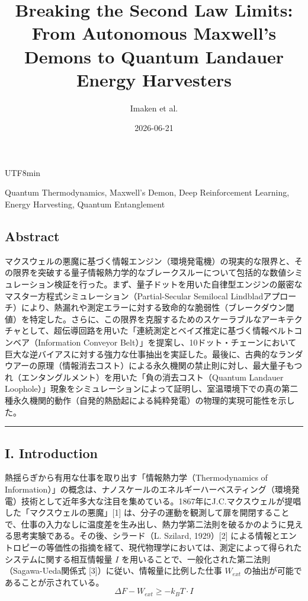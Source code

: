 \documentclass[a4paper,11pt,twocolumn]{article}
\title{Breaking the Second Law Limits: From Autonomous Maxwell's Demons to Quantum Landauer Energy Harvesters}
\author{Imaken et al.}
\date{2026-06-21}
\begin{document}
\begin{CJK*}{UTF8}{min}
\maketitle



 Quantum Thermodynamics, Maxwell's Demon, Deep Reinforcement Learning, Energy Harvesting, Quantum Entanglement


\subsection{Abstract}
マクスウェルの悪魔に基づく情報エンジン（環境発電機）の現実的な限界と、その限界を突破する量子情報熱力学的なブレークスルーについて包括的な数値シミュレーション検証を行った。まず、量子ドットを用いた自律型エンジンの厳密なマスター方程式シミュレーション（Partial-Secular Semilocal Lindbladアプローチ）により、熱漏れや測定エラーに対する致命的な脆弱性（ブレークダウン閾値）を特定した。さらに、この限界を克服するためのスケーラブルなアーキテクチャとして、超伝導回路を用いた「連続測定とベイズ推定に基づく情報ベルトコンベア（Information Conveyor Belt）」を提案し、10ドット・チェーンにおいて巨大な逆バイアスに対する強力な仕事抽出を実証した。最後に、古典的なランダウアーの原理（情報消去コスト）による永久機関の禁止則に対し、最大量子もつれ（エンタングルメント）を用いた「負の消去コスト（Quantum Landauer Loophole）」現象をシミュレーションによって証明し、室温環境下での真の第二種永久機関的動作（自発的熱励起による純粋発電）の物理的実現可能性を示した。

\vspace{1em}\hrule\vspace{1em}

\subsection{I. Introduction}
熱揺らぎから有用な仕事を取り出す「情報熱力学（Thermodynamics of Information）」の概念は、ナノスケールのエネルギーハーベスティング（環境発電）技術として近年多大な注目を集めている。1867年にJ.C.マクスウェルが提唱した「マクスウェルの悪魔」[1] は、分子の運動を観測して扉を開閉することで、仕事の入力なしに温度差を生み出し、熱力学第二法則を破るかのように見える思考実験である。その後、シラード（L. Szilard, 1929）[2] による情報とエントロピーの等価性の指摘を経て、現代物理学においては、測定によって得られたシステムに関する相互情報量 $I$ を用いることで、一般化された第二法則（Sagawa-Ueda関係式 [3]）に従い、情報量に比例した仕事 $W_{ext}$ の抽出が可能であることが示されている。
\begin{equation} \Delta F - W_{ext} \geq -k_B T \cdot I \end{equation}


\end{CJK*}
\end{document}
